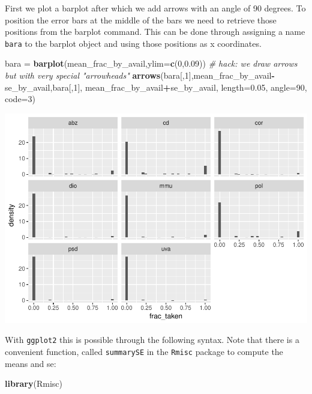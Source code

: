 \documentclass[11pt,]{article}
\newenvironment{Shaded}{\begin{snugshade}}{\end{snugshade}}
\newcommand{\KeywordTok}[1]{\textcolor[rgb]{0.13,0.29,0.53}{\textbf{#1}}}
\newcommand{\DataTypeTok}[1]{\textcolor[rgb]{0.13,0.29,0.53}{#1}}
\newcommand{\DecValTok}[1]{\textcolor[rgb]{0.00,0.00,0.81}{#1}}
\newcommand{\FloatTok}[1]{\textcolor[rgb]{0.00,0.00,0.81}{#1}}
\newcommand{\StringTok}[1]{\textcolor[rgb]{0.31,0.60,0.02}{#1}}
\newcommand{\CommentTok}[1]{\textcolor[rgb]{0.56,0.35,0.01}{\textit{#1}}}
\newcommand{\OperatorTok}[1]{\textcolor[rgb]{0.81,0.36,0.00}{\textbf{#1}}}
\newcommand{\NormalTok}[1]{#1}
\begin{document}
First we plot a barplot after which we add arrows with an angle of 90
degrees. To position the error bars at the middle of the bars we need to
retrieve those positions from the barplot command. This can be done
through assigning a name \texttt{bara} to the barplot object and using
those positions as x coordinates.

\begin{Shaded}
\begin{Highlighting}[]
\NormalTok{bara =}\StringTok{ }\KeywordTok{barplot}\NormalTok{(mean_frac_by_avail,}\DataTypeTok{ylim=}\KeywordTok{c}\NormalTok{(}\DecValTok{0}\NormalTok{,}\FloatTok{0.09}\NormalTok{))}
\CommentTok{# hack: we draw arrows but with very special "arrowheads"}
\KeywordTok{arrows}\NormalTok{(bara[,}\DecValTok{1}\NormalTok{],mean_frac_by_avail}\OperatorTok{-}\NormalTok{se_by_avail,bara[,}\DecValTok{1}\NormalTok{], }
\NormalTok{       mean_frac_by_avail}\OperatorTok{+}\NormalTok{se_by_avail, }\DataTypeTok{length=}\FloatTok{0.05}\NormalTok{, }\DataTypeTok{angle=}\DecValTok{90}\NormalTok{, }\DataTypeTok{code=}\DecValTok{3}\NormalTok{)}
\end{Highlighting}
\end{Shaded}

\includegraphics{Lab_2_modified_files/figure-latex/unnamed-chunk-52-1.pdf}

With \texttt{ggplot2} this is possible through the following syntax.
Note that there is a convenient function, called \texttt{summarySE} in
the \texttt{Rmisc} package to compute the means and se:

\begin{Shaded}
\begin{Highlighting}[]
\KeywordTok{library}\NormalTok{(Rmisc)}
\end{Highlighting}
\end{Shaded}
\end{document}
